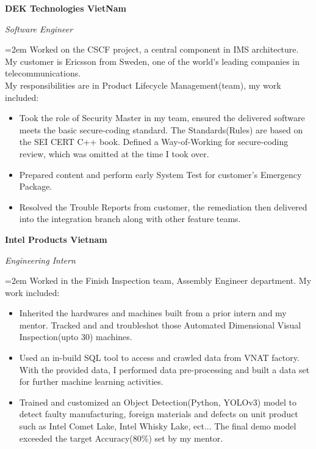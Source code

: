 \documentclass[10pt]{article}
\newcommand{\work}[4]{
  \noindent  \textbf{#1}
  \hfill 
\framebox{%
  \parbox{9em}{%
  \centering\textbf{#2}}} \par
  \noindent \textit{#3} \par
  \vspace*{0.5em}
  \noindent\hangindent=2em\hangafter=0 \small #4 
\normalsize \par}
\begin{document}
\work{DEK Technologies VietNam}
{Nov 2021--May 2023}
{Software Engineer}
{Worked on the CSCF project, a central component in IMS architecture.
 My customer is Ericsson from Sweden, one of the world's leading companies in telecommunications.
 \\ My responsibilities are in Product Lifecycle Management(team), my work included:

\begin{itemize}
    \item Took the role of Security Master in my team, ensured the delivered software meets the basic secure-coding standard.
     The Standards(Rules) are based on the SEI CERT C++ book. 
     Defined a Way-of-Working for secure-coding review, which was omitted at the time I took over. 
    \item Prepared content and perform early System Test for customer's Emergency Package.
    \item Resolved the Trouble Reports from customer, the remediation then delivered into the integration branch along with other feature teams.
\end{itemize}}


\work{Intel Products Vietnam}
{Aug 2020--Feb 2021}
{Engineering Intern}
{Worked in the Finish Inspection team, Assembly Engineer department. My work included:
\begin{itemize}
    \item Inherited the hardwares and machines built from a prior intern and my mentor. 
    Tracked and and troubleshot those Automated Dimensional Visual Inspection(upto 30) machines.
    \item Used an in-build SQL tool to access and crawled data from VNAT factory. 
    With the provided data, I performed data pre-processing and built a data set for further machine learning activities. 
    \item Trained and customized an Object Detection(Python, YOLOv3) model to detect faulty manufacturing, foreign materials and defects on unit product such as Intel Comet Lake, Intel Whisky Lake, ect...
    The final demo model exceeded the target Accuracy(80\%) set by my mentor.
\end{itemize}}

\end{document}
